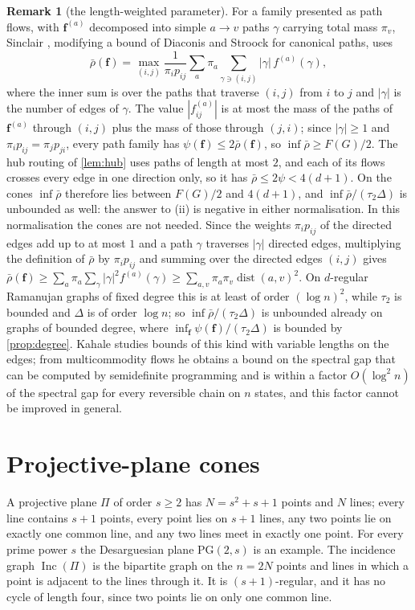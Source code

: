 \documentclass[11pt]{amsart}
\theoremstyle{definition}
\newtheorem{remark}[theorem]{Remark}
\newcommand{\bfF}{\mathbf{f}}
\newcommand{\PG}{\mathrm{PG}}
\DeclareMathOperator{\Inc}{Inc}
\DeclareMathOperator{\dist}{dist}
\begin{document}
\begin{remark}[the length-weighted parameter]
For a family presented as path flows, with $\bfF^{(a)}$ decomposed into simple $a\to v$ paths $\gamma$ carrying total mass $\pi_v$, Sinclair \cite{Sinclair}, modifying a bound of Diaconis and Stroock \cite{DS} for canonical paths, uses
\[
\bar\rho(\bfF)=\max_{(i,j)}\frac1{\pi_ip_{ij}}\sum_a\pi_a\sum_{\gamma\ni(i,j)}|\gamma|\,f^{(a)}(\gamma),
\]
where the inner sum is over the paths that traverse $(i,j)$ from $i$ to $j$ and $|\gamma|$ is the number of edges of $\gamma$. The value $|f^{(a)}_{ij}|$ is at most the mass of the paths of $\bfF^{(a)}$ through $(i,j)$ plus the mass of those through $(j,i)$; since $|\gamma|\ge1$ and $\pi_ip_{ij}=\pi_jp_{ji}$, every path family has $\psi(\bfF)\le2\bar\rho(\bfF)$, so $\inf\bar\rho\ge F(G)/2$. The hub routing of \cref{lem:hub} uses paths of length at most $2$, and each of its flows crosses every edge in one direction only, so it has $\bar\rho\le2\psi<4(d+1)$. On the cones $\inf\bar\rho$ therefore lies between $F(G)/2$ and $4(d+1)$, and $\inf\bar\rho/(\tau_2\Delta)$ is unbounded as well: the answer to (ii) is negative in either normalisation. In this normalisation the cones are not needed. Since the weights $\pi_ip_{ij}$ of the directed edges add up to at most $1$ and a path $\gamma$ traverses $|\gamma|$ directed edges, multiplying the definition of $\bar\rho$ by $\pi_ip_{ij}$ and summing over the directed edges $(i,j)$ gives $\bar\rho(\bfF)\ge\sum_a\pi_a\sum_\gamma|\gamma|^2f^{(a)}(\gamma)\ge\sum_{a,v}\pi_a\pi_v\dist(a,v)^2$. On $d$-regular Ramanujan graphs of fixed degree this is at least of order $(\log n)^2$, while $\tau_2$ is bounded and $\Delta$ is of order $\log n$; so $\inf\bar\rho/(\tau_2\Delta)$ is unbounded already on graphs of bounded degree, where $\inf_{\bfF}\psi(\bfF)/(\tau_2\Delta)$ is bounded by \cref{prop:degree}. Kahale \cite{Kahale} studies bounds of this kind with variable lengths on the edges; from multicommodity flows he obtains a bound on the spectral gap that can be computed by semidefinite programming and is within a factor $O(\log^2n)$ of the spectral gap for every reversible chain on $n$ states, and this factor cannot be improved in general.
\end{remark}

\section{Projective-plane cones}\label{sec:pg}

A projective plane $\Pi$ of order $s\ge2$ has $N=s^2+s+1$ points and $N$ lines; every line contains $s+1$ points, every point lies on $s+1$ lines, any two points lie on exactly one common line, and any two lines meet in exactly one point. For every prime power $s$ the Desarguesian plane $\PG(2,s)$ is an example. The incidence graph $\Inc(\Pi)$ is the bipartite graph on the $n=2N$ points and lines in which a point is adjacent to the lines through it. It is $(s+1)$-regular, and it has no cycle of length four, since two points lie on only one common line.
\end{document}
